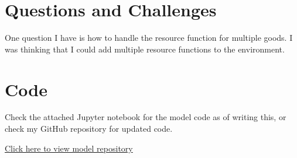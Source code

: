 \documentclass{article}
\begin{document}
\section{Questions and Challenges}
One question I have is how to handle the resource function for multiple goods. I was thinking that I could add multiple resource functions to the environment.

\section{Code}
Check the attached Jupyter notebook for the model code as of writing this, or check my GitHub repository for updated code.
\newline

\centering
\href{https://github.com/Zeke-CE/CSCS530Project-repo.git}{Click here to view model repository}



\clearpage


\end{document}
